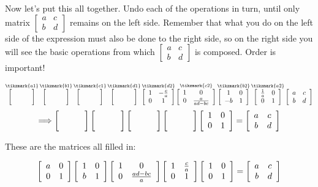 \documentclass[../key.tex]{subfiles}
\begin{document}
\begin{outer_problem}
\item Now let's put this all together. Undo each of the operations in turn, until only matrix $\left[\begin{smallmatrix}a & c \\ b & d \end{smallmatrix}\right]$ remains on the left side. Remember that what you do on the left side of the expression must also be done to the right side, so on the right side you will see the basic operations from which $\left[\begin{smallmatrix}a & c \\ b & d \end{smallmatrix}\right]$ is composed. Order is important!
\end{outer_problem}

\vspace{1.5cm}
$$\mathop{\blanktwomat}^{\tikzmark{a1}}
\mathop{\blanktwomat}^{\tikzmark{b1}}
\mathop{\blanktwomat}^{\tikzmark{c1}}
\mathop{\blanktwomat}^{\tikzmark{d1}}
\mathop{\twomat{1}{-\frac{c}{a}}{0}{1}}^{\tikzmark{d2}}
\mathop{\twomat{1}{0}{0}{\frac{a}{ad-bc}}}^{\tikzmark{c2}}
\mathop{\twomat{1}{0}{-b}{1}}^{\tikzmark{b2}}
\mathop{\twomat{\frac{1}{a}}{0}{0}{1}}^{\tikzmark{a2}}
\twomat{a}{c}{b}{d}$$
$$\Longrightarrow \blanktwomat\blanktwomat\blanktwomat\blanktwomat\twomat{1}{0}{0}{1} = \twomat{a}{c}{b}{d}$$


These are the matrices all filled in:

$$\left[\begin{array}{cc} a & 0 \\ 0 & 1 \end{array}\right]\left[\begin{array}{cc} 1 & 0 \\ b & 1 \end{array}\right]\left[\begin{array}{cc} 1 & 0 \\ 0 & \frac{ad-bc}{a} \end{array}\right]\left[\begin{array}{cc} 1 & \frac{c}{a} \\ 0 & 1 \end{array}\right]\left[\begin{array}{cc} 1 & 0 \\ 0 & 1 \end{array}\right] = \left[\begin{array}{cc} a & c \\ b & d \end{array}\right]$$
\end{document}
